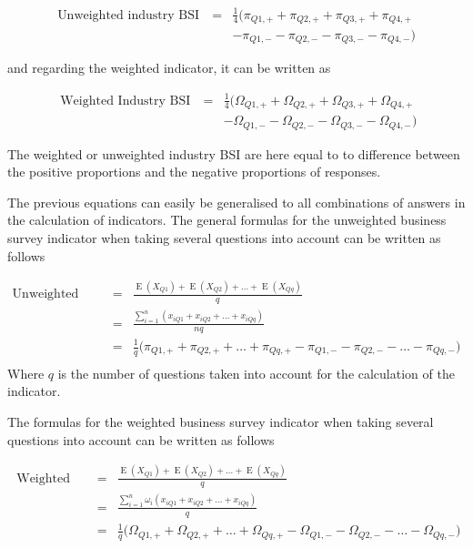 \documentclass[12pt,a4paper,oneside]{book}
\DeclareMathOperator{\E}{E}
\begin{document}
\begin{eqnarray}
    \mbox{Unweighted industry BSI}\ &=& \frac{1}{4} \big( \pi_{Q1,+} + \pi_{Q2,+} + \pi_{Q3,+} + \pi_{Q4,+} \nonumber \\
    && - \pi_{Q1,-} - \pi_{Q2,-} - \pi_{Q3,-} - \pi_{Q4,-} \big)
\end{eqnarray}

and regarding the weighted indicator, it can be written as

\begin{eqnarray}
    \mbox{ Weighted Industry BSI}\ &=& \frac{1}{4} \big( \Omega_{Q1,+} + \Omega_{Q2,+} + \Omega_{Q3,+} + \Omega_{Q4,+} \nonumber \\
    && - \Omega_{Q1,-} - \Omega_{Q2,-} - \Omega_{Q3,-} - \Omega_{Q4,-} \big) 
\end{eqnarray}

The weighted or unweighted industry BSI are here equal to to difference between the positive proportions and the negative proportions of responses.


The previous equations can easily be generalised to all combinations of answers in the calculation of indicators.
The general formulas for the unweighted business survey indicator when taking several questions into account can be written as follows

\begin{eqnarray}
    \mbox{Unweighted BSI} &=& \frac{\E(X_{Q1}) + \E(X_{Q2}) + \ldots + \E(X_{Qq})}{q} \\
    &=& \frac{\sum^n_{i=1}( x_{iQ1} + x_{iQ2} + \ldots + x_{iQq})}{nq} \\
    &=& \frac{1}{q} \big( \pi_{Q1,+} +  \pi_{Q2,+} + \ldots +  \pi_{Qq,+}  -  \pi_{Q1,-} -  \pi_{Q2,-} - \ldots - \pi_{Qq,-} \big) \nonumber\\
\end{eqnarray}
Where $q$ is the number of questions taken into account for the calculation of the indicator.

The formulas for the weighted business survey indicator when taking several questions into account can be written as follows

\begin{eqnarray}
    \mbox{ Weighted BSI} &=& \frac{\E(X_{Q1}) + \E(X_{Q2}) + \ldots + \E(X_{Qq})}{q} \\
    &=& \frac{\sum^n_{i=1} \omega_i \left( x_{iQ1} + x_{iQ2} +\ldots + x_{iQq} \right)}{q} \\    
    &=& \frac{1}{q} \big( \Omega_{Q1,+} + \Omega_{Q2,+} + \ldots + \Omega_{Qq,+} - \Omega_{Q1,-} - \Omega_{Q2,-} - \ldots - \Omega_{Qq,-} \big) \nonumber\\
\end{eqnarray}
\end{document}
